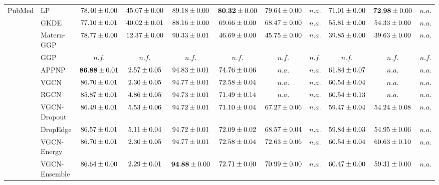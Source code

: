 \begin{table*}[!h]
{\begin{tabular}{ll|cc|cccc|ccc}
        \multirow{14}{*}{PubMed} 
        & LP & ${78.40\tiny \pm 0.00}$ & ${45.07\tiny \pm 0.00}$ & ${89.18\tiny \pm 0.00}$ & ${\mathbf{80.32}\tiny \pm 0.00}$ & ${{79.64}\tiny \pm 0.00}$ & $n.a.$ & ${{71.01}\tiny \pm 0.00}$ & ${\mathbf{72.98}\tiny \pm 0.00}$ & $n.a.$\\
        & GKDE & ${77.10\tiny \pm 0.01}$ & ${40.02\tiny \pm 0.01}$ & ${88.16\tiny \pm 0.00}$ & ${69.66\tiny \pm 0.00}$ & ${68.47\tiny \pm 0.00}$ & $n.a.$ & ${55.81\tiny \pm 0.00}$ & ${54.33\tiny \pm 0.00}$ & $n.a.$\\
        & Matern-GGP & ${78.77\tiny \pm 0.00}$ & ${12.37\tiny \pm 0.00}$ & ${90.33\tiny \pm 0.01}$ & ${46.69\tiny \pm 0.00}$ & ${45.75\tiny \pm 0.00}$ & $n.a.$ & ${39.85\tiny \pm 0.00}$ & ${39.63\tiny \pm 0.00}$ & $n.a.$\\
        & GGP & $n.f.$ & $n.f.$ & $n.f.$ & $n.f.$ & $n.f.$ & $n.f.$ & $n.f.$ & $n.f.$ & $n.f.$\\
        & APPNP & ${\mathbf{86.88}\tiny \pm 0.01}$ & ${2.57\tiny \pm 0.05}$ & ${94.83\tiny \pm 0.01}$ & ${74.76\tiny \pm 0.06}$ & $n.a.$ & $n.a.$ & ${61.84\tiny \pm 0.07}$ & $n.a.$ & $n.a.$\\
        & VGCN & ${86.70\tiny \pm 0.01}$ & ${2.30\tiny \pm 0.05}$ & ${94.77\tiny \pm 0.01}$ & ${72.58\tiny \pm 0.04}$ & $n.a.$ & $n.a.$ & ${60.54\tiny \pm 0.04}$ & $n.a.$ & $n.a.$\\
        & RGCN & ${85.87\tiny \pm 0.01}$ & ${4.86\tiny \pm 0.05}$ & ${94.73\tiny \pm 0.01}$ & ${71.49\tiny \pm 0.14}$ & $n.a.$ & $n.a.$ & ${60.54\tiny \pm 0.13}$ & $n.a.$ & $n.a.$\\
        & VGCN-Dropout & ${86.49\tiny \pm 0.01}$ & ${5.53\tiny \pm 0.06}$ & ${94.72\tiny \pm 0.01}$ & ${71.10\tiny \pm 0.04}$ & ${67.27\tiny \pm 0.06}$ & $n.a.$ & ${59.47\tiny \pm 0.04}$ & ${54.24\tiny \pm 0.08}$ & $n.a.$\\
        & DropEdge & ${86.57\tiny \pm 0.01}$ & ${5.11\tiny \pm 0.04}$ & ${94.72\tiny \pm 0.01}$ & ${72.09\tiny \pm 0.02}$ & ${68.57\tiny \pm 0.04}$ & $n.a.$ & ${59.84\tiny \pm 0.03}$ & ${54.95\tiny \pm 0.06}$ & $n.a.$\\
        & VGCN-Energy & ${86.70\tiny \pm 0.01}$ & ${2.30\tiny \pm 0.05}$ & ${94.77\tiny \pm 0.01}$ & ${72.58\tiny \pm 0.04}$ & ${72.63\tiny \pm 0.06}$ & $n.a.$ & ${60.54\tiny \pm 0.04}$ & ${60.63\tiny \pm 0.10}$ & $n.a.$\\
        & VGCN-Ensemble & ${86.64\tiny \pm 0.00}$ & ${2.29\tiny \pm 0.01}$ & ${\mathbf{94.88}\tiny \pm 0.00}$ & ${72.71\tiny \pm 0.00}$ & ${70.99\tiny \pm 0.00}$ & $n.a.$ & ${60.47\tiny \pm 0.00}$ & ${59.31\tiny \pm 0.00}$ & $n.a.$\\

\end{tabular}}
\end{table*}
